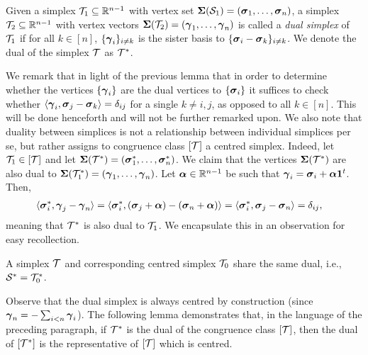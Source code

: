 \begin{definition}
\label{def:dual_simplex}
Given a simplex $\mathcal{T}_1\subseteq\mathbb{R}^{n-1}$ with vertex set $\boldsymbol{\Sigma}(\mathcal{S}_1)=(\vb*{\sigma}_1,\dots,\vb*{\sigma}_n)$, a simplex $\mathcal{T}_2\subseteq \mathbb{R}^{n-1}$ with vertex vectors $\boldsymbol{\Sigma}(\mathcal{T}_2)=(\vb*{\gamma}_1,\dots,\vb*{\gamma}_n)$ is called a \emph{dual simplex} of $\mathcal{T}_1$ if for all $k\in[n]$, $\{\vb*{\gamma}_i\}_{i\neq k}$ is the sister basis to $\{\vb*{\sigma}_i-\vb*{\sigma}_k\}_{i\neq k}$. We denote the dual of the simplex $\mathcal{T}$ as $\mathcal{T}^*$. 
\end{definition}

We remark that in light of the previous lemma that in order to determine whether the vertices $\{\vb*{\gamma}_i\}$ are the dual vertices to $\{\vb*{\sigma}_i\}$ it suffices to check whether $\langle \vb*{\gamma}_i,\vb*{\sigma}_j-\vb*{\sigma}_k\rangle=\delta_{ij}$ for a single $k\neq i,j$, as opposed to all $k\in[n]$. This will be done henceforth and will not be further remarked upon. 
We also note that duality between simplices is not a relationship between individual simplices per se, but rather assigns to congruence class $[\mathcal{T}]$ a centred simplex. Indeed, let $\mathcal{T}_1\in[\mathcal{T}]$
and  let $\boldsymbol{\Sigma}(\mathcal{T}^*)=(\vb*{\sigma}_1^*,\dots,\vb*{\sigma}_n^*)$. We claim that  the vertices $\boldsymbol{\Sigma}(\mathcal{T}^*)$ are also dual to $\boldsymbol{\Sigma}(\mathcal{T}_1^*)=(\vb*{\gamma}_1,\dots,\vb*{\gamma}_n)$. Let  $\vb*{\alpha}\in\mathbb{R}^{n-1}$  be such that $\vb*{\gamma}_i = \vb*{\sigma}_i + \vb*{\alpha}\vb{1}^t$. Then, 
\begin{align*}
\langle \vb*{\sigma}_i^*,\vb*{\gamma}_j-\vb*{\gamma}_n\rangle &= \langle \vb*{\sigma}_i^*,(\vb*{\sigma}_j+\vb*{\alpha}) - (\vb*{\sigma}_n+\vb*{\alpha})\rangle = \langle \vb*{\sigma}_i^*,\vb*{\sigma}_j-\vb*{\sigma}_n\rangle=\delta_{ij},
\end{align*}
meaning that $\mathcal{T}^*$ is also dual to $\mathcal{T}_1$. We encapsulate this in an observation for easy recollection. 

\begin{observation}
	\label{obs:dual_centred}
	A simplex $\mathcal{T}$ and corresponding centred simplex $\mathcal{T}_0$ share the same dual, i.e., $\mathcal{S}^* = \mathcal{T}_0^*$. 
\end{observation}


Observe that the dual simplex is always centred by construction (since $\vb*{\gamma}_n=-\sum_{i<n}\vb*{\gamma}_i$).  The following lemma demonstrates that, in the language of the preceding paragraph, if $\mathcal{T}^*$ is the dual of the congruence class $[\mathcal{T}]$, then the dual of $[\mathcal{T}^*]$ is the representative of $[\mathcal{T}]$ which is centred. 

